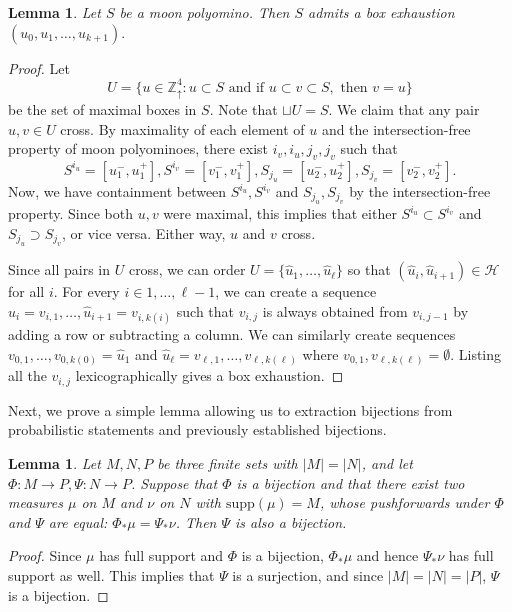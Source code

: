 \documentclass[aop, preprint]{imsart}
\theoremstyle{plain}
\newtheorem{lemma}[theorem]{Lemma}
\theoremstyle{definition}
\theoremstyle{plain}
\newcommand{\sset}{\subset}
\newcommand{\Zd}{\mathds{Z}^4_\uparrow}
\newcommand{\scrH}{\mathcal{H}}
\newcommand{\supp}{\text{supp}}
\begin{document}
\begin{lemma}
	\label{L:moon}
	Let $S$ be a moon polyomino. Then $S$ admits a box exhaustion $(u_0, u_1, \dots, u_{k+1}).$
\end{lemma}

\begin{proof}
	Let
	$$
	U = \{u \in \Zd : u \sset S \text{ and if } u \sset v \sset S, \text{ then } v = u \}
	$$ 
	be the set of maximal boxes in $S$. Note that $\sqcup U = S$. We claim that any pair $u, v \in U$ cross. By maximality of each element of $u$ and the intersection-free property of moon polyominoes, there exist $i_v, i_u, j_v, j_v$ such that 
	$$
	S^{i_u} = [u^-_1, u^+_1], S^{i_v} = [v^-_1, v^+_1], S_{j_u} = [u^-_2, u^+_2], S_{j_v} = [v^-_2, v^+_2].
	$$
	Now, we have containment between $S^{i_u},S^{i_v}$ and $S_{j_u}, S_{j_v}$ by the intersection-free property. Since both $u, v$ were maximal, this implies that either $S^{i_u} \sset S^{i_v}$ and $S_{j_u} \supset S_{j_v}$, or vice versa. Either way, $u$ and $v$ cross.
	
	Since all pairs in $U$ cross, we can order $U = \{\hat u_1, \dots, \hat u_\ell\}$ so that $(\hat u_i,\hat u_{i+1}) \in \scrH$ for all $i$. For every $i \in 1, \dots, \ell -1$, we can create a sequence $\hat u_i = v_{i, 1}, \dots, \hat u_{i+1} = v_{i, k(i)}$ such that $v_{i, j}$ is always obtained from $v_{i, j-1}$ by adding a row or subtracting a column. We can similarly create sequences $v_{0, 1}, \dots, v_{0, k(0)} = \hat u_1$ and $\hat u_\ell = v_{\ell, 1}, \dots, v_{\ell, k(\ell)}$ where $v_{0, 1}, v_{\ell, k(\ell)} = \emptyset$. Listing all the $v_{i, j}$ lexicographically gives a box exhaustion.
\end{proof}

Next, we prove a simple lemma allowing us to extraction bijections from probabilistic statements and previously established bijections.

\begin{lemma}
	\label{L:prob-bij}
	Let $M,N, P$ be three finite sets with $|M|=|N|$, and let $\Phi:M \to P, \Psi:N \to P$. Suppose that $\Phi$ is a bijection and that there exist two measures $\mu$ on $M$ and $\nu$ on $N$ with $\supp(\mu) = M$, whose pushforwards under $\Phi$ and $\Psi$ are equal: $\Phi_* \mu = \Psi_* \nu$. Then $\Psi$ is also a bijection.
\end{lemma}

\begin{proof}
	Since $\mu$ has full support and $\Phi$ is a bijection, $\Phi_* \mu$ and hence $\Psi_* \nu$ has full support as well. This implies that $\Psi$ is a surjection, and since $|M| = |N| = |P|$, $\Psi$ is a bijection. 
\end{proof}
\end{document}
